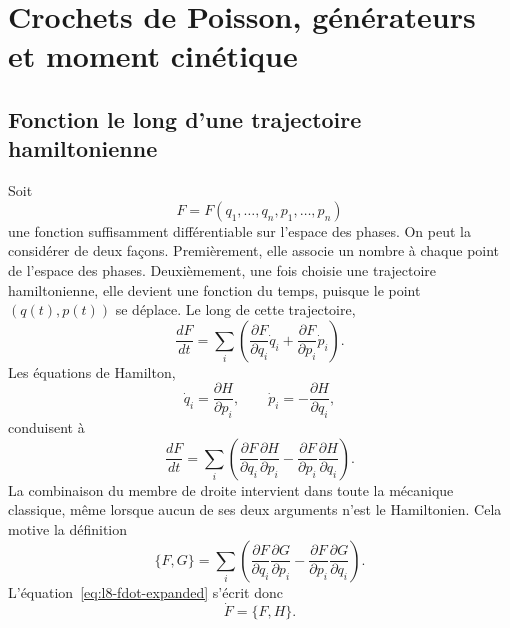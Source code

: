 \chapter{Crochets de Poisson, générateurs et moment cinétique}


\section{Fonction le long d’une trajectoire hamiltonienne}

Soit
\[
  F=F(q_1,\ldots,q_n,p_1,\ldots,p_n)
\]
une fonction suffisamment différentiable sur l’espace des phases. On peut la considérer de deux façons. Premièrement, elle associe un nombre à chaque point de l’espace des phases. Deuxièmement, une fois choisie une trajectoire hamiltonienne, elle devient une fonction du temps, puisque le point \((q(t),p(t))\) se déplace. Le long de cette trajectoire,
\begin{equation}
  \frac{dF}{dt}
  =
  \sum_i\left(
    \frac{\partial F}{\partial q_i}\dot q_i
    +\frac{\partial F}{\partial p_i}\dot p_i
  \right).
  \label{eq:l8-chain-rule}
\end{equation}
Les équations de Hamilton,
\begin{equation}
  \dot q_i=\frac{\partial H}{\partial p_i},
  \qquad
  \dot p_i=-\frac{\partial H}{\partial q_i},
  \label{eq:l8-hamilton-equations}
\end{equation}
conduisent à
\begin{equation}
  \frac{dF}{dt}
  =
  \sum_i\left(
    \frac{\partial F}{\partial q_i}
    \frac{\partial H}{\partial p_i}
    -
    \frac{\partial F}{\partial p_i}
    \frac{\partial H}{\partial q_i}
  \right).
  \label{eq:l8-fdot-expanded}
\end{equation}
La combinaison du membre de droite intervient dans toute la mécanique classique, même lorsque aucun de ses deux arguments n’est le Hamiltonien. Cela motive la définition
\begin{equation}
  \boxed{
  \{F,G\}
  =
  \sum_i\left(
    \frac{\partial F}{\partial q_i}
    \frac{\partial G}{\partial p_i}
    -
    \frac{\partial F}{\partial p_i}
    \frac{\partial G}{\partial q_i}
  \right).}
  \label{eq:l8-poisson-definition}
\end{equation}
L’équation~\eqref{eq:l8-fdot-expanded} s’écrit donc
\begin{equation}
  \boxed{\dot F=\{F,H\}.}
  \label{eq:l8-time-generator}
\end{equation}

